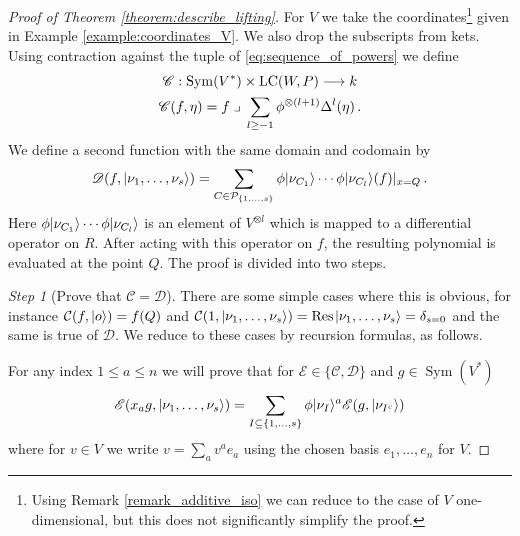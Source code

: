 \documentclass[english,letter paper,12pt,reqno]{article}
\DeclarePairedDelimiter\ket{\lvert}{\rangle}
\theoremstyle{example}
\numberwithin{equation}{section}
\DeclareMathOperator{\Sym}{Sym}
\DeclareMathOperator{\LC}{LC}
\begin{document}
\begin{proof}[Proof of Theorem \ref{theorem:describe_lifting}] For $V$ we take the coordinates\footnote{Using Remark \ref{remark_additive_iso} we can reduce to the case of $V$ one-dimensional, but this does not significantly simplify the proof.} given in Example \ref{example:coordinates_V}. We also drop the subscripts from kets. Using contraction against the tuple of \eqref{eq:sequence_of_powers} we define
\begin{gather*}
\mathscr{C}: \Sym(V^*) \times \LC( W, P ) \lto k\\
\mathscr{C}(f, \eta) = f \; \lrcorner \; \sum_{l \ge -1} \phi^{\otimes (l+1)} \Delta^l( \eta )\,.
\end{gather*}
We define a second function with the same domain and codomain by
\[
\mathscr{D}(f, \ket{\nu_1, \ldots, \nu_s}) = \sum_{C \in \cat{P}_{\{1,\ldots,s\}}} \phi \ket{\nu_{C_1}} \cdots \phi \ket{\nu_{C_l}}(f)\arrowvert_{x = Q}\,.
\]
Here $\phi \ket{\nu_{C_1}} \cdots \phi \ket{\nu_{C_l}}$ is an element of $V^{\otimes l}$ which is mapped to a differential operator on $R$. After acting with this operator on $f$, the resulting polynomial is evaluated at the point $Q$. The proof is divided into two steps.

\emph{Step 1} (Prove that $\mathscr{C} = \mathscr{D}$). There are some simple cases where this is obvious, for instance $\cat{C}(f, \ket{o}) = f( Q )$ and $\cat{C}( 1, \ket{\nu_1,\ldots,\nu_s} ) = \Res\;\ket{\nu_1,\ldots,\nu_s} = \delta_{s = 0}$ and the same is true of $\mathscr{D}$. We reduce to these cases by recursion formulas, as follows.

For any index $1 \le a \le n$ we will prove that for $\mathscr{E} \in \{ \mathscr{C}, \mathscr{D} \}$ and $g \in \Sym(V^*)$
\begin{equation}\label{eq:recur_formula}
\mathscr{E}( x_a g, \ket{\nu_1,\ldots,\nu_s} ) = \sum_{I \subseteq \{ 1,\ldots,s\}} \phi\ket{\nu_I}^a \mathscr{E}( g, \ket{\nu_{I^c}})
\end{equation}
where for $v \in V$ we write $v = \sum_a v^a e_a$ using the chosen basis $e_1,\ldots,e_n$ for $V$.


\end{proof}
\end{document}
